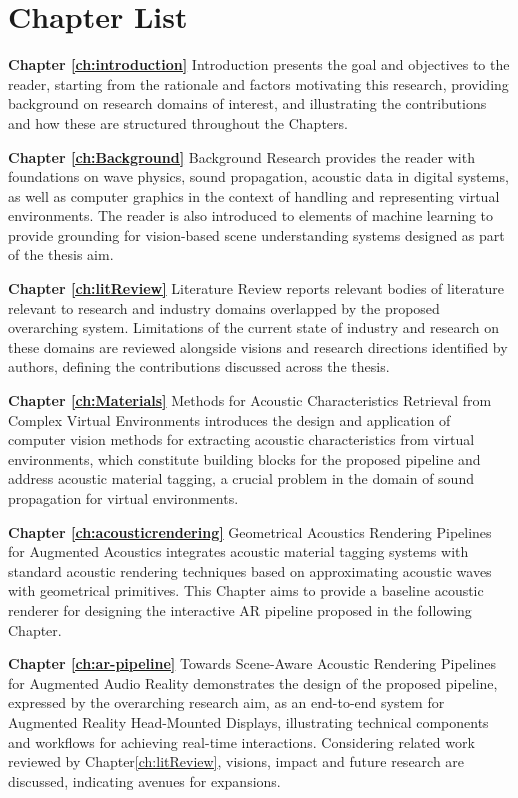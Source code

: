 \section{Chapter List}
\textbf{Chapter \ref{ch:introduction}} Introduction presents the goal and objectives to the reader, starting from the rationale and factors motivating this research, providing background on research domains of interest, and illustrating the contributions and how these are structured throughout the Chapters.

\textbf{Chapter \ref{ch:Background}} Background Research provides the reader with foundations on wave physics, sound propagation, acoustic data in digital systems, as well as computer graphics in the context of handling and representing virtual environments. The reader is also introduced to elements of machine learning to provide grounding for vision-based scene understanding systems designed as part of the thesis aim.

\textbf{Chapter \ref{ch:litReview}} Literature Review reports relevant bodies of literature relevant to research and industry domains overlapped by the proposed overarching system. Limitations of the current state of industry and research on these domains are reviewed alongside visions and research directions identified by authors, defining the contributions discussed across the thesis.

\textbf{Chapter \ref{ch:Materials}} Methods for Acoustic Characteristics Retrieval from Complex Virtual Environments introduces the design and application of computer vision methods for extracting acoustic characteristics from virtual environments, which constitute building blocks for the proposed pipeline and address acoustic material tagging, a crucial problem in the domain of sound propagation for virtual environments.

\textbf{Chapter \ref{ch:acousticrendering}} Geometrical Acoustics Rendering Pipelines for Augmented Acoustics integrates acoustic material tagging systems with standard acoustic rendering techniques based on approximating acoustic waves with geometrical primitives. This Chapter aims to provide a baseline acoustic renderer for designing the interactive AR pipeline proposed in the following Chapter.

\textbf{Chapter \ref{ch:ar-pipeline}} Towards Scene-Aware Acoustic Rendering Pipelines for Augmented Audio Reality demonstrates the design of the proposed pipeline, expressed by the overarching research aim, as an end-to-end system for Augmented Reality Head-Mounted Displays, illustrating technical components and workflows for achieving real-time interactions. Considering related work reviewed by Chapter\ref{ch:litReview}, visions, impact and future research are discussed, indicating avenues for expansions.

